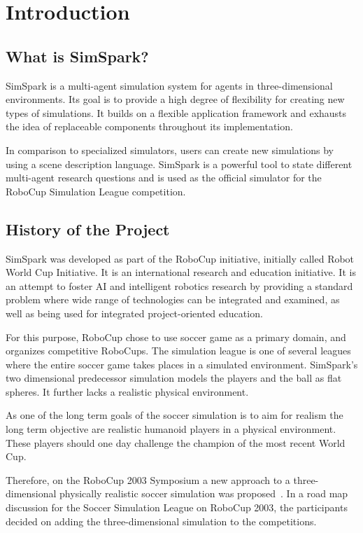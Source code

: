 \chapter{Introduction}

\section{What is SimSpark?}

SimSpark is a multi-agent simulation system for agents in
three-dimensional environments. Its goal is to provide a high degree
of flexibility for creating new types of simulations. It builds on a
flexible application framework and exhausts the idea of replaceable
components throughout its implementation.

In comparison to specialized simulators, users can create new
simulations by using a scene description language. SimSpark is a
powerful tool to state different multi-agent research questions and is
used as the official simulator for the RoboCup Simulation League
competition.

\section{History of the Project}

SimSpark was developed as part of the RoboCup initiative, initially
called Robot World Cup Initiative. It is an international research and
education initiative. It is an attempt to foster AI and intelligent
robotics research by providing a standard problem where wide range of
technologies can be integrated and examined, as well as being used for
integrated project-oriented education.

For this purpose, RoboCup chose to use soccer game as a primary
domain, and organizes competitive RoboCups. The simulation league is
one of several leagues where the entire soccer game takes places in a
simulated environment. SimSpark's two dimensional predecessor
simulation models the players and the ball as flat spheres. It further
lacks a realistic physical environment.

As one of the long term goals of the soccer simulation is to aim for
realism the long term objective are realistic humanoid players in a
physical environment. These players should one day challenge the
champion of the most recent World Cup.

Therefore, on the RoboCup 2003 Symposium a new approach to a
three-dimensional physically realistic soccer simulation was
proposed~\cite{KO04}. In a road map discussion for the Soccer Simulation League on
RoboCup 2003, the participants decided on adding the three-dimensional
simulation to the competitions.

